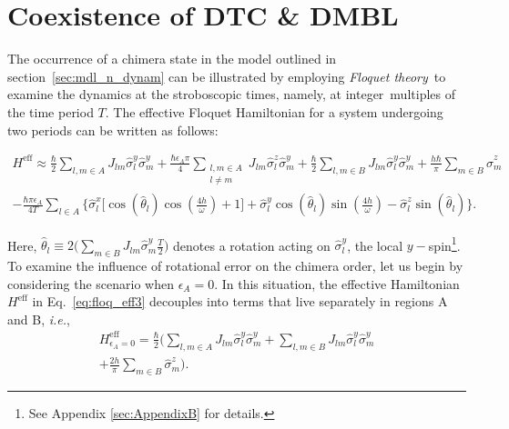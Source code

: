 \documentclass[%
nofootinbib,
reprint,
superscriptaddress,
amsmath,amssymb,showkeys,
aps,
prb,
]{revtex4-2}
\begin{document}
	\section{\label{sec:level3}Coexistence of DTC \& DMBL}
The occurrence of a chimera state in the model outlined in section~\ref{sec:mdl_n_dynam} can be illustrated by employing \textit{Floquet theory} to examine the dynamics at the stroboscopic times, namely, at integer multiples of the time period $T$. The effective Floquet Hamiltonian for a system undergoing two periods can be written as follows:
		\begin{widetext}
			\begin{multline}
				H^{\mathrm{eff}} \approx\frac{\hbar}{2} \sum_{l,m\in A}J_{lm}\hat{\sigma}_l^y\hat{\sigma}_m^y +\frac{\hbar \epsilon_A \pi}{4} \sum_{\substack{l,m\in A\\l\neq m}} J_{lm}\hat{\sigma}^z_l\hat{\sigma}^y_m + \frac{\hbar}{2}\sum_{l,m\in B}J_{lm}\hat{\sigma}_l^y \hat{\sigma}_m^y + \frac{h\hbar}{\pi}\sum_{m \in B}\hat{\sigma}^z_m \\ -\frac{\hbar \pi \epsilon_A}{4T}\sum_{l\in A}\Bigg\{\hat{\sigma}^x_l \bigg[\cos(\hat{\theta}_l)\cos(\frac{4h}{\omega})+1 \bigg] + \hat{\sigma}^y_l \cos(\hat{\theta}_l)\sin(\frac{4h}{\omega})-\hat{\sigma}^z_l \sin(\hat{\theta}_l)\Bigg\}.
				\label{eq:floq_eff3}
			\end{multline}
		\end{widetext}
	 Here, $\displaystyle \hat{\theta}_l \equiv 2 \Big(\sum_{m \in B}J_{lm}\hat{\sigma}^y_m \frac{T}{2} \Big)$ denotes a rotation acting on $\hat{\sigma}^y_l$, the local $y-$spin\footnote{See Appendix \ref{sec:AppendixB} for details.}. 
	 To examine the influence of rotational error on the chimera order, let us begin by considering the scenario when $\epsilon_A=0$. In this situation, the effective Hamiltonian $H^\mathrm{eff}$ in Eq.~\eqref{eq:floq_eff3}  decouples into terms that live separately in regions A and B, \textit{i.e.},
		\begin{multline}
			H^{\mathrm{eff}}_{\epsilon_A=0} =  \frac{\hbar}{2}\Bigg( \sum_{l,m\in A} J_{lm} \hat{\sigma}^y_l\hat{\sigma}^y_m +\sum_{l,m\in B} J_{lm} \hat{\sigma}^y_l\hat{\sigma}^y_m\\+\frac{2h }{\pi}\sum_{m \in B}\hat{\sigma}^z_m\Bigg).
		\end{multline}
\end{document}
